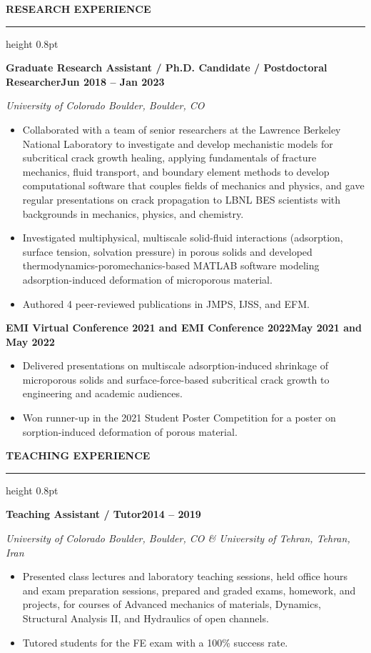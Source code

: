 \documentclass[10pt, letterpaper]{article}
\newcommand{\rsection}[1]{%
  \vspace{8pt}%
  {\large\bfseries\MakeUppercase{#1}}%
  \vspace{1pt}%
  \hrule height 0.8pt%
  \vspace{4pt}%
}
\newcommand{\jobline}[2]{%
  \vspace{5pt}%
  \noindent\textbf{#1}\hfill\textbf{#2}\par%
  \vspace{1pt}%
}
\newcommand{\subline}[1]{%
  \vspace{-1pt}%
  \noindent\textit{#1}\par%
  \vspace{1pt}%
}
\newenvironment{rlist}{%
  \begin{itemize}[leftmargin=1.4em, itemsep=1pt, topsep=2pt, parsep=0pt]%
}{%
  \end{itemize}%
}
\begin{document}
\rsection{Research Experience}

\jobline{Graduate Research Assistant / Ph.D. Candidate / Postdoctoral Researcher}{Jun 2018 -- Jan 2023}
\subline{University of Colorado Boulder, Boulder, CO}
\begin{rlist}
  \item Collaborated with a team of senior researchers at the Lawrence Berkeley National Laboratory to investigate and develop mechanistic models for subcritical crack growth healing, applying fundamentals of fracture mechanics, fluid transport, and boundary element methods to develop computational software that couples fields of mechanics and physics, and gave regular presentations on crack propagation to LBNL BES scientists with backgrounds in mechanics, physics, and chemistry.
  \item Investigated multiphysical, multiscale solid-fluid interactions (adsorption, surface tension, solvation pressure) in porous solids and developed thermodynamics-poromechanics-based MATLAB software modeling adsorption-induced deformation of microporous material.
  \item Authored 4 peer-reviewed publications in JMPS, IJSS, and EFM.
\end{rlist}

\jobline{EMI Virtual Conference 2021 and EMI Conference 2022}{May 2021 and May 2022}
\begin{rlist}
  \item Delivered presentations on multiscale adsorption-induced shrinkage of microporous solids and surface-force-based subcritical crack growth to engineering and academic audiences.
  \item Won runner-up in the 2021 Student Poster Competition for a poster on sorption-induced deformation of porous material.
\end{rlist}


\rsection{Teaching Experience}

\jobline{Teaching Assistant / Tutor}{2014 -- 2019}
\subline{University of Colorado Boulder, Boulder, CO \& University of Tehran, Tehran, Iran}
\begin{rlist}
  \item Presented class lectures and laboratory teaching sessions, held office hours and exam preparation sessions, prepared and graded exams, homework, and projects, for courses of Advanced mechanics of materials, Dynamics, Structural Analysis II, and Hydraulics of open channels.
  \item Tutored students for the FE exam with a 100\% success rate.
\end{rlist}
\end{document}
